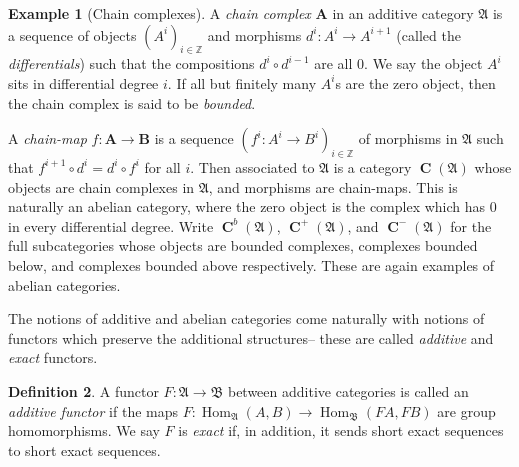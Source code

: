 \documentclass[a4paper]{article}
\theoremstyle{definition}
\newtheorem{defn}{Definition}[section]
\newtheorem{example}[defn]{Example}
\theoremstyle{remark}
\DeclareMathOperator{\Hom}{\text{Hom}}
\DeclareMathOperator{\Ch}{\mathbf{C}}
\begin{document}
\begin{example}[Chain complexes] 
    A \textit{chain complex} \(\mathbf{A}\) in an additive category
    \(\mathfrak{A}\) is a sequence of objects \((A^i)_{i\in\mathbb{Z}}\) and
    morphisms \(d^i:A^i\rightarrow A^{i+1}\) (called the \textit{differentials})
    such that the compositions \(d^i\circ d^{i-1}\) are all \(0\). We say the
    object \(A^i\) sits in differential degree \(i\). If all but finitely many
    \(A^i\)s are the zero object, then the chain complex is said to be
    \textit{bounded}.

    A \textit{chain-map} \(f: \mathbf{A} \rightarrow
    \mathbf{B}\) is a sequence \((f^i:A^i\rightarrow B^i)_{i\in \mathbb{Z}}\) of
    morphisms in \(\mathfrak{A}\) such that \({f^{i+1}\circ d^i = d^i \circ
    f^i}\) for all \(i\). Then associated to \(\mathfrak{A}\) is a category
    \(\Ch(\mathfrak{A})\) whose objects are chain complexes in \(\mathfrak{A}\),
    and morphisms are chain-maps. This is naturally an abelian category, where
    the zero object is the complex which has \(0\) in every differential degree.
    Write \(\Ch^b(\mathfrak{A})\), \(\Ch^+(\mathfrak{A})\), and
    \(\Ch^-(\mathfrak{A})\) for the full subcategories whose objects are
    bounded complexes, complexes bounded below, and complexes bounded
    above respectively. These are again examples of abelian categories.
\end{example}

The notions of additive and abelian categories come naturally with notions of
functors which preserve the additional structures-- these are called
\textit{additive} and \textit{exact} functors.

\begin{defn}
    A functor \(F:\mathfrak{A}\rightarrow \mathfrak{B}\) between additive
    categories is called an \textit{additive functor} if the maps \(F:
    \Hom_\mathfrak{A}(A,B)\rightarrow \Hom_{\mathfrak{B}}(FA,FB)\) are group
    homomorphisms. We say \(F\) is \textit{exact} if, in addition, it sends
    short exact sequences to short exact sequences.
\end{defn}
\end{document}
